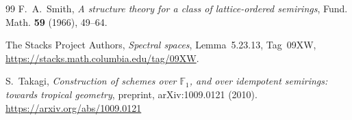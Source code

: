 \documentclass[12pt,leqno]{amsart}
\theoremstyle{definition}
\numberwithin{equation}{section}
\theoremstyle{remark}
\begin{document}
\begin{thebibliography}{99}
F.~A.~Smith,
\emph{A structure theory for a class of lattice-ordered semirings},
Fund. Math. \textbf{59} (1966), 49--64.

The Stacks Project Authors,
\emph{Spectral spaces}, Lemma~5.23.13, Tag~09XW,
\url{https://stacks.math.columbia.edu/tag/09XW}.

S.~Takagi,
\emph{Construction of schemes over $\mathds{F}_1$, and over idempotent semirings: towards tropical geometry},
preprint, arXiv:1009.0121 (2010).
\url{https://arxiv.org/abs/1009.0121}

\end{thebibliography}
\end{document}
